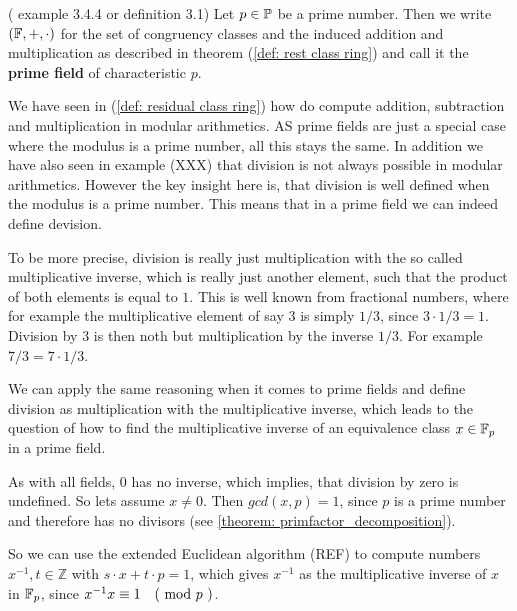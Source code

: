 \begin{definition} (\cite{JB} example 3.4.4 or \cite{AL} definition 3.1)
Let $p \in \mathbb{P}$ be a prime number. Then we write $ (\mathbb{F}, +, \cdot) $ for the set of congruency classes and the induced addition and multiplication 
as described in theorem (\ref{def: rest class ring}) and call it the \textbf{prime field} of characteristic $p$.
\end{definition}
\begin{remark}
We have seen in (\ref{def: residual class ring}) how do compute addition, subtraction and multiplication in modular arithmetics. AS prime fields are just a special case where the modulus is a prime number, all this stays the same. In addition we have also seen in example (XXX) that division is not always possible in modular arithmetics. However the key insight here is, that division is well defined when the modulus is a prime number. This means that in a prime field we can indeed define devision.

To be more precise, division is really just multiplication with the so called multiplicative inverse, which is really just another element, such that the product of both elements is equal to $1$. This is well known from fractional numbers, where for example the multiplicative element of say $3$ is simply $1/3$, since $3\cdot 1/3 =1$. Division by $3$ is then noth but multiplication by the inverse $1/3$. For example $7/3 = 7 \cdot 1/3$.

We can apply the same reasoning when it comes to prime fields and define division as multiplication with the multiplicative inverse, which leads to the question of how to find the multiplicative inverse of an equivalence class $ x \in \mathbb{F}_p $ in a prime field. 

As with all fields, $0$ has no inverse, which implies, that division by zero is undefined. So lets assume $ x \neq 0 $. Then $ gcd (x, p) = 1 $, since $p$ is a prime number and therefore has no divisors (see \ref{theorem: primfactor_decomposition}). 

So we can use the extended Euclidean algorithm (REF) to compute numbers $x^{-1}, t \in \mathbb{Z} $ with $ s \cdot x + t \cdot p = 1 $, which gives $x^{-1}$ as the multiplicative inverse of $x$ in $\mathbb{F}_p$, since $ x^{-1}x \equiv 1 \quad \text{( mod } p \text{ )}$. 
\end{remark}
